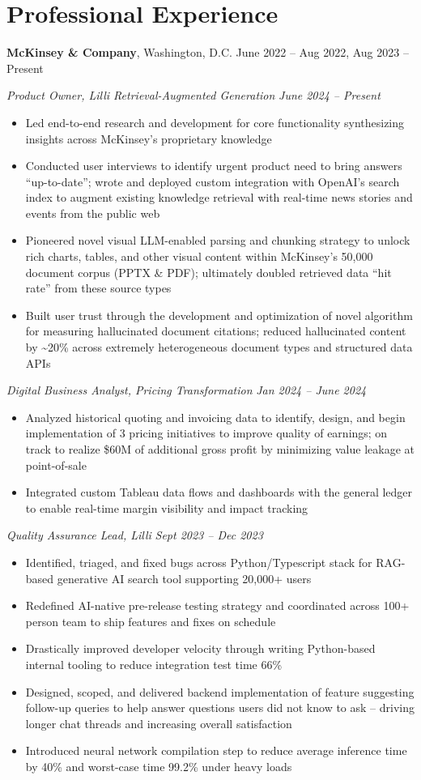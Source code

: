 \documentclass[10.5pt]{article}
\newcommand{\postlinebreakspacing} {
  \vspace{0.7ex}
}
\newcommand{\roleheader}[3]{
  \postlinebreakspacing
  \textbf{#1}, #2 \hfill #3
}
\newcommand{\role}[4]{
  \roleheader{#1}{#2}{#3}

  #4
}
\newcommand{\subrole}[5]{
  \vspace{0.4ex}
  \textit{#1, #2} \hfill \textit{#3 -- #4}

  \begin{itemize}
    #5
  \end{itemize}
}
\begin{document}
\section*{Professional Experience}
\role
{McKinsey \& Company}
{Washington, D.C.}
{June 2022 -- Aug 2022, Aug 2023 -- Present}
{
	\subrole
	{Product Owner}
	{Lilli Retrieval-Augmented Generation}
	{June 2024} {Present}
	{
		\item Led end-to-end research and development for core functionality synthesizing insights across McKinsey's proprietary knowledge
		\item Conducted user interviews to identify urgent product need to bring answers ``up-to-date''; wrote and deployed custom integration with OpenAI's search index to augment existing knowledge retrieval with real-time news stories and events from the public web
		\item Pioneered novel visual LLM-enabled parsing and chunking strategy to unlock rich charts, tables, and other visual content within McKinsey's 50,000 document corpus (PPTX \& PDF); ultimately doubled retrieved data ``hit rate'' from these source types
		\item Built user trust through the development and optimization of novel algorithm for measuring hallucinated document citations; reduced hallucinated content by \textasciitilde20\% across extremely heterogeneous document types and structured data APIs
	}

	\subrole
	{Digital Business Analyst}
	{Pricing Transformation}
	{Jan 2024}
	{June 2024}
	{
		\item Analyzed historical quoting and invoicing data to identify, design, and begin implementation of 3 pricing initiatives to improve quality of earnings; on track to realize \$60M of additional gross profit by minimizing value leakage at point-of-sale
		\item Integrated custom Tableau data flows and dashboards with the general ledger to enable real-time margin visibility and impact tracking
	}

	\subrole
	{Quality Assurance Lead}
	{Lilli}
	{Sept 2023}
	{Dec 2023}
	{
		\item Identified, triaged, and fixed bugs across Python/Typescript stack for RAG-based generative AI search tool supporting 20,000+ users
		\item Redefined AI-native pre-release testing strategy and coordinated across 100+ person team to ship features and fixes on schedule
		\item Drastically improved developer velocity through writing Python-based internal tooling to reduce integration test time 66\%
		\item Designed, scoped, and delivered backend implementation of feature suggesting follow-up queries to help answer questions users did not know to ask – driving longer chat threads and increasing overall satisfaction
		\item Introduced neural network compilation step to reduce average inference time by 40\% and worst-case time 99.2\% under heavy loads
	}


}
\end{document}
